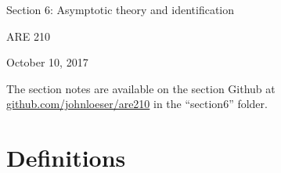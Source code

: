 \documentclass[12pt,english]{article}
\begin{document}
\begin{center}
{\Large{}Section 6: Asymptotic theory and identification}
\par\end{center}{\Large \par}

\begin{center}
ARE 210
\par\end{center}

\begin{center}
October 10, 2017
\par\end{center}

The section notes are available on the section Github at \href{github.com/johnloeser/are210}{github.com/johnloeser/are210} in the ``section6'' folder.

\section{Definitions}
\end{document}
